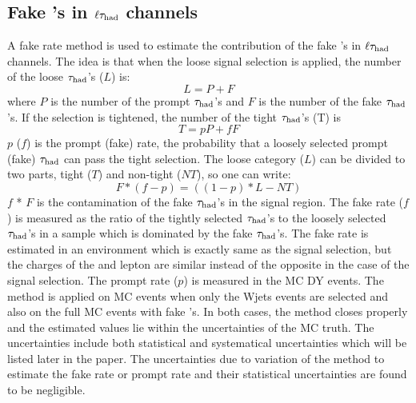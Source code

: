 \subsection{\texorpdfstring{Fake \Tau's in $\ell\tau_{\rm had}$ channels}{Fake taus in lepton-tau channels}}
A fake rate method is used to estimate the contribution of the fake \Tau's in $\ell\tau_{\rm had}$ channels. 
The idea is that when the loose signal selection is applied, the number of the loose $\tau_{\rm had}$'s ($L$) is:
\begin{equation}
L = P + F
\end{equation}
where $P$ is the number of the  prompt $\tau_{\rm had}$'s and $F$ is the number of the  fake $\tau_{\rm had}$'s. If the selection is tightened, the number of the tight $\tau_{\rm had}$'s (T) is
\begin{equation}
 T = pP + fF
\end{equation} 
$p$ ($f$) is the prompt (fake) rate, the probability that a loosely selected prompt (fake) $\tau_{\rm had}$ can pass the  tight  selection. The loose category ($L$) can be divided to two parts, 
tight ($T$) and non-tight ($NT$), so one can write:
\begin{equation}
   F * (f - p) = ((1 - p) * L - NT)
\end{equation}
$f$ * $F$ is the contamination of the fake $\tau_{\rm had}$'s in the signal region. 
The fake rate ($f$) is measured as the ratio of the tightly selected $\tau_{\rm had}$'s to the loosely 
selected $\tau_{\rm had}$'s in a sample which is dominated by the fake $\tau_{\rm had}$'s. The fake rate is estimated in an environment which is exactly 
same as the signal selection, but the charges of the \Tau and lepton are similar instead of the opposite in the case of the signal selection.
The prompt rate ($p$) is measured in the MC DY events. The method is applied on MC events when only the Wjets events are selected and 
also on the full MC events with fake \Tau's. In both cases, the method closes properly and the estimated values lie within 
the uncertainties of the MC truth. The uncertainties include both statistical and systematical uncertainties which will be listed later in 
the paper. The uncertainties due to variation of the method to estimate the fake rate or prompt rate and their statistical uncertainties 
are found to be negligible.


